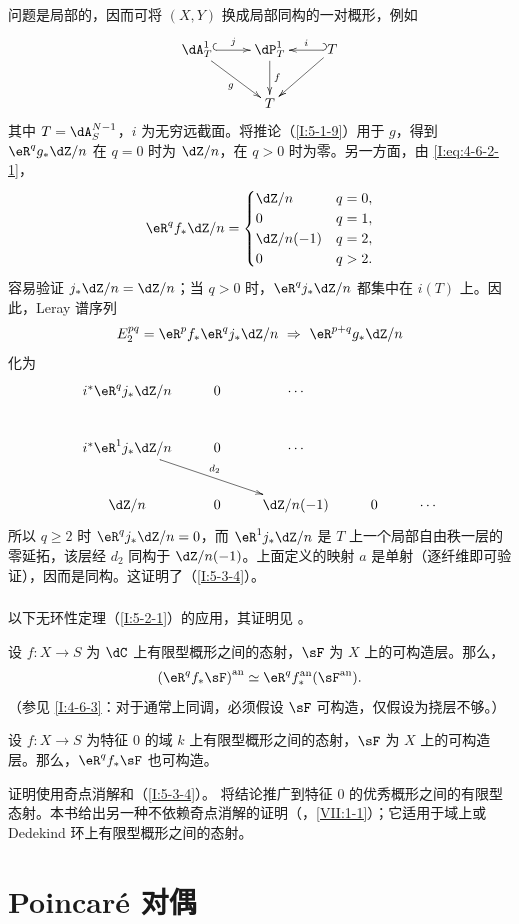 问题是局部的，因而可将 $(X,Y)$ 换成局部同构的一对概形，例如
\[\xymatrix{
\dA_T^1\ar@{^{(}->}[r]^-j\ar[dr]_-g&\dP_T^1\ar[d]^-f&\ar@{_{(}->}[l]_-iT\ar[dl]\\
&T
}\]
其中 $T=\dA_S^{N-1}$，$i$ 为无穷远截面。将推论（\ref{I:5-1-9}）用于 $g$，得到 $\eR^qg_*\dZ/n$ 在 $q=0$ 时为 $\dZ/n$，在 $q>0$ 时为零。另一方面，由 \eqref{I:eq:4-6-2-1}，
\[
\eR^qf_*\dZ/n=
\begin{cases}
\dZ/n&q=0,\\
0&q=1,\\
\dZ/n(-1)&q=2,\\
0&q>2.
\end{cases}
\]
容易验证 $j_*\dZ/n=\dZ/n$；当 $q>0$ 时，$\eR^qj_*\dZ/n$ 都集中在 $i(T)$ 上。因此，Leray 谱序列
\[
E_2^{pq}=\eR^pf_*\eR^qj_*\dZ/n\ \Rightarrow\ \eR^{p+q}g_*\dZ/n
\]
化为
\[\xymatrix{
i^*\eR^qj_*\dZ/n&0&\cdots\\
i^*\eR^1j_*\dZ/n\ar[drr]^-{d_2}&0&\cdots\\
\dZ/n&0&\dZ/n(-1)&0&\cdots
}\]
所以 $q\geqslant2$ 时 $\eR^qj_*\dZ/n=0$，而 $\eR^1j_*\dZ/n$ 是 $T$ 上一个局部自由秩一层的零延拓，该层经 $d_2$ 同构于 $\dZ/n(-1)$。上面定义的映射 $a$ 是单射（逐纤维即可验证），因而是同构。这证明了（\ref{I:5-3-4}）。
\subsubsection{}\label{I:5-3-5}
以下无环性定理（\ref{I:5-2-1}）的应用，其证明见 \cite[XVI.4,5]{sga4}。
\begingroup
\renewcommand{\thesubsubsection}{\thesection.\arabic{subsection}.5.1}
\begin{theorem}\label{I:5-3-6}
设 $f:X\to S$ 为 $\dC$ 上有限型概形之间的态射，$\sF$ 为 $X$ 上的可构造层。那么，
\[
\an{(\eR^qf_*\sF)}\simeq\eR^q\an f_*(\an\sF).
\]
（参见 \ref{I:4-6-3}：对于通常上同调，必须假设 $\sF$ 可构造，仅假设为挠层不够。）
\end{theorem}
\endgroup
\begingroup
\renewcommand{\thesubsubsection}{\thesection.\arabic{subsection}.5.2}
\begin{theorem}\label{I:5-3-7}
设 $f:X\to S$ 为特征 $0$ 的域 $k$ 上有限型概形之间的态射，$\sF$ 为 $X$ 上的可构造层。那么，$\eR^qf_*\sF$ 也可构造。
\end{theorem}
\endgroup
证明使用奇点消解和（\ref{I:5-3-4}）。\cite[XIX.5]{sga4} 将结论推广到特征 $0$ 的优秀概形之间的有限型态射。本书给出另一种不依赖奇点消解的证明（，\ref{VII:1-1}）；它适用于域上或 Dedekind 环上有限型概形之间的态射。

\section{Poincaré 对偶}\label{I:6}
